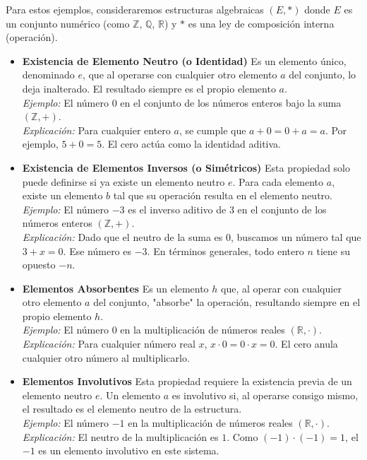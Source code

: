 \documentclass{article}
\begin{document}
Para estos ejemplos, consideraremos estructuras algebraicas $(E, *)$ donde $E$ es un conjunto numérico (como $\mathbb{Z}$, $\mathbb{Q}$, $\mathbb{R}$) y $*$ es una ley de composición interna (operación).
\begin{itemize}
\item \textbf{Existencia de Elemento Neutro (o Identidad)}
Es un elemento único, denominado $e$, que al operarse con cualquier otro elemento $a$ del conjunto, lo deja inalterado. El resultado siempre es el propio elemento $a$.\\ 
\textit{Ejemplo:} El número $0$ en el conjunto de los números enteros bajo la suma $(\mathbb{Z}, +)$. \\
\textit{Explicación:} Para cualquier entero $a$, se cumple que $a + 0 = 0 + a = a$. Por ejemplo, $5 + 0 = 5$. El cero actúa como la identidad aditiva.
\bigskip

\item \textbf{Existencia de Elementos Inversos (o Simétricos)}
Esta propiedad solo puede definirse si ya existe un elemento neutro $e$. Para cada elemento $a$, existe un elemento $b$ tal que su operación resulta en el elemento neutro.\\
\textit{Ejemplo:} El número $-3$ es el inverso aditivo de $3$ en el conjunto de los números enteros $(\mathbb{Z}, +)$.\\
\textit{Explicación:} Dado que el neutro de la suma es $0$, buscamos un número tal que $3 + x = 0$. Ese número es $-3$. En términos generales, todo entero $n$ tiene su opuesto $-n$.
\bigskip

\item \textbf{Elementos Absorbentes}
Es un elemento $h$ que, al operar con cualquier otro elemento $a$ del conjunto, "absorbe" la operación, resultando siempre en el propio elemento $h$.\\
\textit{Ejemplo:} El número $0$ en la multiplicación de números reales $(\mathbb{R}, \cdot)$. \\
\textit{Explicación:} Para cualquier número real $x$, $x \cdot 0 = 0 \cdot x = 0$. El cero anula cualquier otro número al multiplicarlo.

\item \textbf{Elementos Involutivos}
Esta propiedad requiere la existencia previa de un elemento neutro $e$. Un elemento $a$ es involutivo si, al operarse consigo mismo, el resultado es el elemento neutro de la estructura. \\
\textit{Ejemplo:} El número $-1$ en la multiplicación de números reales $(\mathbb{R}, \cdot)$. \\
\textit{Explicación:} El neutro de la multiplicación es $1$. Como $(-1) \cdot (-1) = 1$, el $-1$ es un elemento involutivo en este sistema.
\bigskip


\end{itemize}
\end{document}
